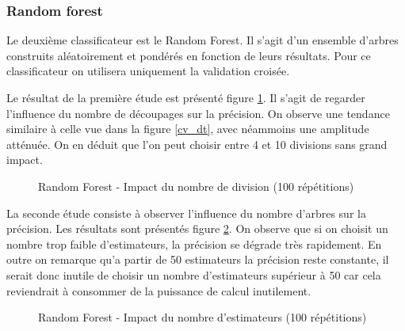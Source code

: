 \documentclass[11pt,a4paper]{article}
\begin{document}
		\subsubsection{Random forest}
		
			Le deuxième classificateur est le Random Forest. Il s'agit d'un ensemble d'arbres construits aléatoirement et pondérés en fonction de leurs résultats. Pour ce classificateur on utilisera uniquement la validation croisée.

			Le résultat de la première étude est présenté figure \ref{random_forest}. Il s'agit de regarder l'influence du nombre de découpages sur la précision. On observe une tendance similaire à celle vue dans la figure \ref{cv_dt}, avec néammoins une amplitude atténuée. On en déduit que l'on peut choisir entre 4 et 10 divisions sans grand impact.


			\begin{figure}
			\begin{center}
				\caption{Random Forest - Impact du nombre de division (100 répétitions)}
				\label{random_forest}
			\end{center}
			\end{figure}

			La seconde étude consiste à observer l'influence du nombre d'arbres sur la précision. Les résultats sont présentés figure \ref{rf_estimators}. On observe que si on choisit un nombre trop faible d'estimateurs, la précision se dégrade très rapidement. En outre on remarque qu'a partir de 50 estimateurs la précision reste constante, il serait donc inutile de choisir un nombre d'estimateurs supérieur à 50 car cela reviendrait à consommer de la puissance de calcul inutilement.

			\begin{figure}
			\begin{center}
				\caption{Random Forest - Impact du nombre d'estimateurs (100 répétitions)}
				\label{rf_estimators}
			\end{center}
			\end{figure}
\end{document}

